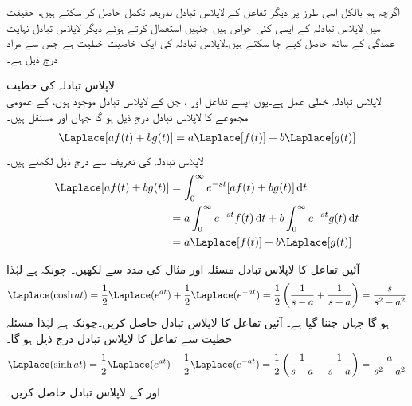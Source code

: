 اگرچہ ہم بالکل اسی طرز پر دیگر تفاعل کے لاپلاس تبادل بذریعہ تکمل حاصل کر سکتے ہیں، حقیقت میں لاپلاس تبادلہ کے ایسی کئی خواص ہیں جنہیں استعمال کرتے ہوئے دیگر لاپلاس تبادل نہایت عمدگی کے ساتھ حاصل کیے جا سکتے ہیں۔لاپلاس تبادلہ کی ایک خاصیت  خطیت ہے جس سے مراد درج ذیل ہے۔

\quad لاپلاس تبادلہ کی خطیت\\
لاپلاس تبادلہ خطی عمل ہے۔یوں ایسے تفاعل  اور ، جن کے لاپلاس تبادل موجود ہوں، کے عمومی مجموعے کا لاپلاس تبادل درج ذیل ہو گا جہاں  اور  مستقل ہیں۔
\begin{align*}
\Laplace[af(t)+bg(t)]=a\Laplace[f(t)]+b\Laplace[g(t)]
\end{align*}
لاپلاس تبادلہ کی تعریف سے درج ذیل لکھتے ہیں۔
\begin{align*}
\Laplace[af(t)+bg(t)]&=\int_{0}^{\infty}e^{-st}[af(t)+bg(t)]\dif t\\
&=a\int_{0}^{\infty}e^{-st}f(t)\dif t+b\int_{0}^{\infty}e^{-st}g(t) \dif t\\
&=a\Laplace[f(t)]+b\Laplace[g(t)]
\end{align*}

آئیں تفاعل  کا لاپلاس تبادل مسئلہ  اور مثال  کی مدد سے لکھیں۔
 چونکہ  ہے لہٰذا 
\begin{align*}
\Laplace(\cosh at)=\frac{1}{2}\Laplace(e^{at})+\frac{1}{2}\Laplace(e^{-at})=\frac{1}{2}\left(\frac{1}{s-a}+\frac{1}{s+a}\right)=\frac{s}{s^2-a^2}
\end{align*}
ہو گا جہاں  چننا گیا ہے۔
آئیں تفاعل  کا لاپلاس تبادل حاصل کریں۔چونکہ  ہے لہٰذا مسئلہ خطیت سے تفاعل کا لاپلاس تبادل درج ذیل ہو گا۔
\begin{align*}
\Laplace(\sinh at)=\frac{1}{2}\Laplace(e^{at})-\frac{1}{2}\Laplace(e^{-at})=\frac{1}{2}\left(\frac{1}{s-a}-\frac{1}{s+a}\right)=\frac{a}{s^2-a^2}
\end{align*}
 اور  کے لاپلاس تبادل حاصل کریں۔

